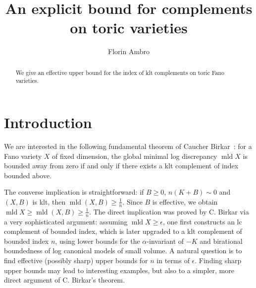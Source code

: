 \documentclass[12pt,twoside]{amsart}
\author{Florin Ambro}
\newcommand{\mld}{\operatorname{mld}}
\theoremstyle{plain}
\theoremstyle{definition}
\theoremstyle{remark}
\begin{document}

\title{An explicit bound for complements on toric varieties}
\maketitle

\begin{abstract} 
We give an effective upper bound for the index of klt complements on toric Fano varieties.
\end{abstract} 





\section*{Introduction}


We are interested in the following fundamental theorem of Caucher Birkar~\cite{Birk21}:
for a Fano variety $X$ of fixed dimension, the global minimal log discrepancy $\mld X$ is bounded away 
from zero if and only if there exists a klt complement of index bounded above. 

The converse 
implication is straightforward: if $B\ge 0$, $n(K+B)\sim 0$ and $(X,B)$ is klt, then $\mld(X,B)\ge \frac{1}{n}$.
Since $B$ is effective, we obtain $\mld X\ge \mld(X,B) \ge \frac{1}{n}$. The direct implication was 
proved by C. Birkar via a very sophisticated argument: assuming $\mld X\ge \epsilon$, 
one first constructs an lc complement of bounded index, which is later upgraded to a klt
complement of bounded index $n$, using lower bounds for the $\alpha$-invariant of $-K$ and
birational boundedness of log canonical models of small volume. A natural question is 
to find effective (possibly sharp) upper bounds for $n$ in terms of $\epsilon$.
Finding sharp upper bounds may lead to interesting examples, but also to a simpler, more 
direct argument of C. Birkar's theorem.
\end{document}
